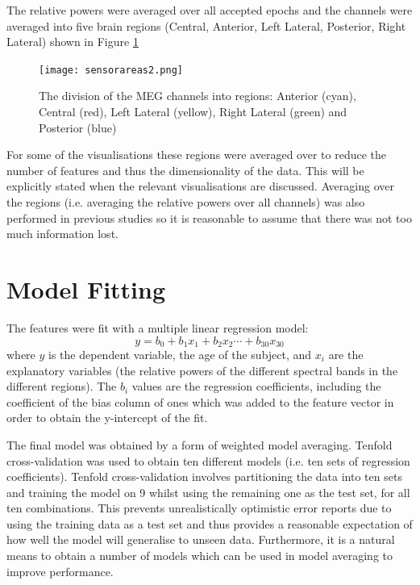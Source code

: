 The relative powers were averaged over all accepted epochs and the channels were averaged into five brain regions (Central, Anterior, Left Lateral, Posterior, Right Lateral) shown in Figure \ref{fig:sensorareas}


\begin{figure}[h!]
  \centering
    \texttt{[image: sensorareas2.png]}
    \caption{The division of the MEG channels into regions: Anterior (cyan), Central (red), Left Lateral (yellow), Right Lateral (green) and Posterior (blue) \cite{Escudero2013}}
    \label{fig:sensorareas}
\end{figure}

For some of the visualisations these regions were averaged over to reduce the number of features and thus the dimensionality of the data. This will be explicitly stated when the relevant visualisations are discussed. Averaging over the regions (i.e. averaging the relative powers over all channels) was also performed in previous studies \cite{Gomez2013} so it is reasonable to assume that there was not too much information lost.


\section{Model Fitting}

The features were fit with a multiple linear regression model:
\begin{equation} y = b_0 + b_1 x_1 + b_2 x_2 \cdots + b_{30} x_{30} \end{equation}
where $y$ is the dependent variable, the age of the subject, and $x_i$ are the explanatory variables (the relative powers of the different spectral bands in the different regions). The $b_i$ values are the regression coefficients, including the coefficient of the bias column of ones which was added to the feature vector in order to obtain the y-intercept of the fit.

The final model was obtained by a form of weighted model averaging. Tenfold cross-validation was used to obtain ten different models (i.e. ten sets of regression coefficients). Tenfold cross-validation involves partitioning the data into ten sets and training the model on 9 whilst using the remaining one as the test set, for all ten combinations. This prevents unrealistically optimistic error reports due to using the training data as a test set and thus provides a reasonable expectation of how well the model will generalise to unseen data. Furthermore, it is a natural means to obtain a number of models which can be used in model averaging to improve performance.

